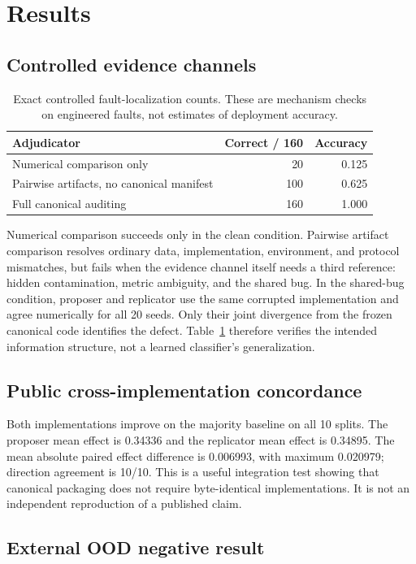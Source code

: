 \documentclass[10pt]{article}
\begin{document}
\section{Results}
\subsection{Controlled evidence channels}
\begin{table}[t]
\centering
\small
\begin{tabular}{lrr}
\toprule
Adjudicator & Correct / 160 & Accuracy \\
\midrule
Numerical comparison only & 20 & 0.125 \\
Pairwise artifacts, no canonical manifest & 100 & 0.625 \\
Full canonical auditing & 160 & 1.000 \\
\bottomrule
\end{tabular}
\caption{Exact controlled fault-localization counts. These are mechanism checks on engineered faults, not estimates of deployment accuracy.}
\label{tab:controlled}
\end{table}

Numerical comparison succeeds only in the clean condition. Pairwise artifact comparison resolves ordinary data, implementation, environment, and protocol mismatches, but fails when the evidence channel itself needs a third reference: hidden contamination, metric ambiguity, and the shared bug. In the shared-bug condition, proposer and replicator use the same corrupted implementation and agree numerically for all 20 seeds. Only their joint divergence from the frozen canonical code identifies the defect. Table~\ref{tab:controlled} therefore verifies the intended information structure, not a learned classifier's generalization.

\subsection{Public cross-implementation concordance}
Both implementations improve on the majority baseline on all 10 splits. The proposer mean effect is 0.34336 and the replicator mean effect is 0.34895. The mean absolute paired effect difference is 0.006993, with maximum 0.020979; direction agreement is 10/10. This is a useful integration test showing that canonical packaging does not require byte-identical implementations. It is not an independent reproduction of a published claim.

\subsection{External OOD negative result}
\begin{table}[t]
\centering
\scriptsize

\caption{Question-level OOD outcomes. Task-bootstrap intervals are conditional on the 17 observed task clusters and degenerate at zero because every observed outcome is zero. Wilson intervals show the binomial uncertainty from 0/20 events.}
\label{tab:external}
\end{table}
\end{document}
